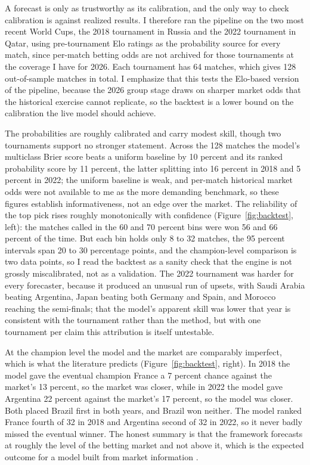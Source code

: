 \documentclass[11pt,letterpaper]{article}
\begin{document}
A forecast is only as trustworthy as its calibration, and the only way to check calibration is against realized results. I therefore ran the pipeline on the two most recent World Cups, the 2018 tournament in Russia and the 2022 tournament in Qatar, using pre-tournament Elo ratings as the probability source for every match, since per-match betting odds are not archived for those tournaments at the coverage I have for 2026. Each tournament has 64 matches, which gives 128 out-of-sample matches in total. I emphasize that this tests the Elo-based version of the pipeline, because the 2026 group stage draws on sharper market odds that the historical exercise cannot replicate, so the backtest is a lower bound on the calibration the live model should achieve.

The probabilities are roughly calibrated and carry modest skill, though two tournaments support no stronger statement. Across the 128 matches the model's multiclass Brier score beats a uniform baseline by 10 percent and its ranked probability score \citep{constantinou2012} by 11 percent, the latter splitting into 16 percent in 2018 and 5 percent in 2022; the uniform baseline is weak, and per-match historical market odds were not available to me as the more demanding benchmark, so these figures establish informativeness, not an edge over the market. The reliability of the top pick rises roughly monotonically with confidence (Figure~\ref{fig:backtest}, left): the matches called in the 60 and 70 percent bins were won 56 and 66 percent of the time. But each bin holds only 8 to 32 matches, the 95 percent intervals span 20 to 30 percentage points, and the champion-level comparison is two data points, so I read the backtest as a sanity check that the engine is not grossly miscalibrated, not as a validation. The 2022 tournament was harder for every forecaster, because it produced an unusual run of upsets, with Saudi Arabia beating Argentina, Japan beating both Germany and Spain, and Morocco reaching the semi-finals; that the model's apparent skill was lower that year is consistent with the tournament rather than the method, but with one tournament per claim this attribution is itself untestable.

At the champion level the model and the market are comparably imperfect, which is what the literature predicts (Figure~\ref{fig:backtest}, right). In 2018 the model gave the eventual champion France a 7 percent chance against the market's 13 percent, so the market was closer, while in 2022 the model gave Argentina 22 percent against the market's 17 percent, so the model was closer. Both placed Brazil first in both years, and Brazil won neither. The model ranked France fourth of 32 in 2018 and Argentina second of 32 in 2022, so it never badly missed the eventual winner. The honest summary is that the framework forecasts at roughly the level of the betting market and not above it, which is the expected outcome for a model built from market information \citep{strumbelj2014, hvattum2010}.
\end{document}
